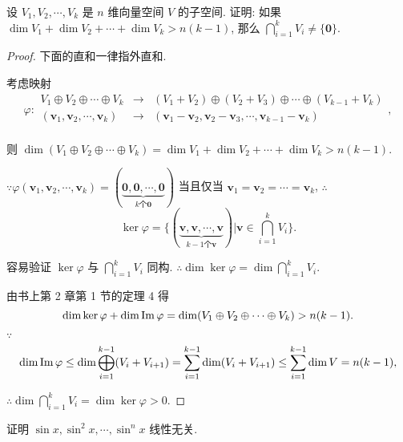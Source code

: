 \documentclass[color=black,device=normal,lang=cn,mode=geye]{elegantnote}
\begin{document}
\addtocounter{exercise}{2}
\begin{exercise}%
    设 $V_1,V_2,\cdots,V_k$ 是 $n$ 维向量空间 $V$ 的子空间. 证明: 如果 $\dim V_1+\dim V_2+\cdots+\dim V_k>n(k-1)$, 那么 $\bigcap\limits_{i=1}^kV_i\neq\{\boldsymbol{0}\}$.
\end{exercise}
\begin{proof}
    下面的直和一律指外直和.

    考虑映射
    \[\varphi:\begin{array}{rcl}
        V_1\oplus V_2\oplus\cdots\oplus V_k & \to & (V_1+V_2)\oplus(V_2+V_3)\oplus\cdots\oplus(V_{k-1}+V_k) \\
        (\boldsymbol{v}_1,\boldsymbol{v}_2,\cdots,\boldsymbol{v}_k) & \to & (\boldsymbol{v}_1-\boldsymbol{v}_2,\boldsymbol{v}_2-\boldsymbol{v}_3,\cdots,\boldsymbol{v}_{k-1}-\boldsymbol{v}_k) \\
    \end{array},\]

    则 $\dim(V_1\oplus V_2\oplus\cdots\oplus V_k)=\dim V_1+\dim V_2+\cdots+\dim V_k>n(k-1)$.

    $\because\varphi(\boldsymbol{v}_1,\boldsymbol{v}_2,\cdots,\boldsymbol{v}_k)=(\underbrace{\boldsymbol{0},\boldsymbol{0},\cdots,\boldsymbol{0}}_{k\text{个}\boldsymbol{0}})$ 当且仅当 $\boldsymbol{v}_1=\boldsymbol{v}_2=\cdots=\boldsymbol{v}_k$, $\therefore$
    \[\ker\varphi=\bigg\{(\underbrace{\boldsymbol{v},\boldsymbol{v},\cdots,\boldsymbol{v}}_{k-1\text{个}\boldsymbol{v}})\bigg|\boldsymbol{v}\in\bigcap\limits_{i=1}^kV_i\bigg\}.\]

    容易验证 $\ker\varphi$ 与 $\bigcap\limits_{i=1}^kV_i$ 同构. $\therefore\dim\ker\varphi=\dim\bigcap\limits_{i=1}^kV_i$.

    由书上第 2 章第 1 节的定理 4 得
    \[\dim\ker\varphi+\dim\operatorname{Im} \varphi=\dim(V_1\oplus V_2\oplus\cdots\oplus V_k)>n(k-1).\]

    $\because$
    \[\dim\operatorname{Im} \varphi\leq\dim\bigoplus\limits_{i=1}^{k-1}(V_i+V_{i+1})=\sum\limits_{i=1}^{k-1}\dim(V_i+V_{i+1})\leq\sum\limits_{i=1}^{k-1}\dim V=n(k-1),\]

    $\therefore\dim\bigcap\limits_{i=1}^kV_i=\dim\ker\varphi>0$.
\end{proof}
\begin{exercisec}[1.2.3(4)]
    证明 $\sin x,\sin^2x,\cdots,\sin^nx$ 线性无关.
\end{exercisec}
\end{document}
